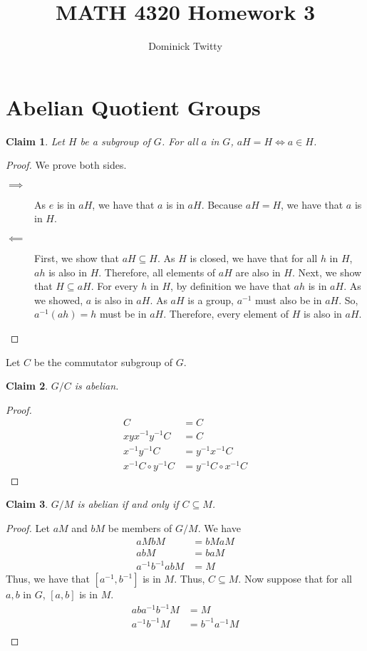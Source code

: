 \documentclass[12pt]{article}
\newtheorem*{claim*}{Claim}
\newcommand*{\inv}{^{-1}}
\begin{document}
\title{MATH 4320 Homework 3}
\author{Dominick Twitty}
\date{}
\maketitle

\section{Abelian Quotient Groups}
\begin{claim*}
Let $H$ be a subgroup of $G$. For all $a$ in $G$, $aH = H \iff a \in H$.
\end{claim*}
\begin{proof}
We prove both sides.
\begin{description}
\item[$\implies$] As $e$ is in $aH$, we have that $a$ is in $aH$. Because $aH = H$, we have that $a$ is in $H$.
\item[$\impliedby$] First, we show that $aH \subseteq H$. As $H$ is closed, we have that for all $h$ in $H$, $ah$ is also in $H$. Therefore, all elements of $aH$ are also in $H$. Next, we show that $H \subseteq aH$. For every $h$ in $H$, by definition we have that $ah$ is in $aH$. As we showed, $a$ is also in $aH$. As $aH$ is a group, $a\inv$ must also be in $aH$. So, $a\inv (ah) = h$ must be in $aH$. Therefore, every element of $H$ is also in $aH$.
\end{description}
\end{proof}

Let $C$ be the commutator subgroup of $G$.
\begin{claim*}
$G / C$ is abelian.
\end{claim*}
\begin{proof}
\begin{align*}
[x,y] C &= C\\
xy x\inv y\inv C &= C\\
x\inv y\inv C &= y\inv x\inv C\\
x\inv C \circ y\inv C &= y\inv C \circ x\inv C
\end{align*}
\end{proof}

\begin{claim*}
$G / M$ is abelian if and only if $C \subseteq M$.
\end{claim*}
\begin{proof}
Let $aM$ and $bM$ be members of $G/M$. We have
\begin{align*}
aMbM &= bMaM\\
abM &= baM\\
a\inv b\inv a b M &= M
\end{align*}
Thus, we have that $[a\inv, b\inv]$ is in $M$. Thus, $C \subseteq M$. Now suppose that for all $a, b$ in $G$, $[a,b]$ is in $M$.
\begin{align*}
ab a\inv b\inv M &= M\\
a\inv b\inv M &= b\inv a\inv M\\
\end{align*}
\end{proof}
\end{document}
